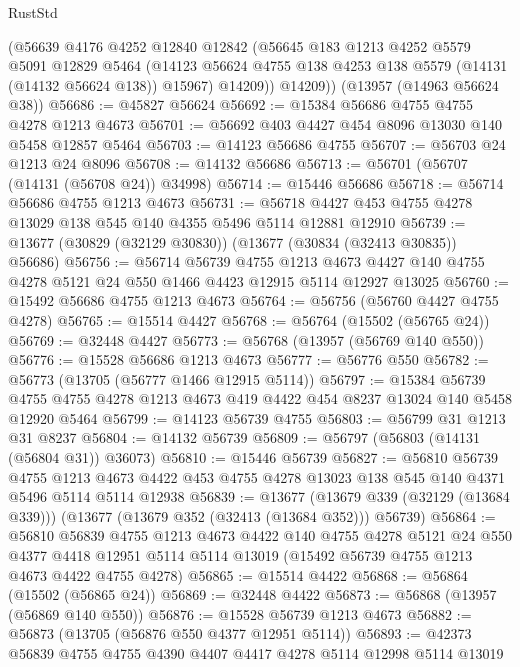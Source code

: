 \begin{lexlean}{RustStd}
\begin{coremodule}
        (@56639
          @4176
          @4252
          @12840
          @12842
          (@56645
            @183
            @1213
            @4252
            @5579
            @5091
            @12829
            @5464
            (@14123 @56624 @4755 @138 @4253 @138 @5579 (@14131 (@14132 @56624 @138)) @15967)
            @14209))
        @14209))
    (@13957 (@14963 @56624 @38))
@56686 := @45827 @56624
@56692 := @15384 @56686 @4755 @4755 @4278 @1213 @4673
@56701 := @56692 @403 @4427 @454 @8096 @13030 @140 @5458 @12857 @5464
@56703 := @14123 @56686 @4755
@56707 := @56703 @24 @1213 @24 @8096
@56708 := @14132 @56686
@56713 := @56701 (@56707 (@14131 (@56708 @24)) @34998)
@56714 := @15446 @56686
@56718 := @56714 @56686 @4755 @1213 @4673
@56731 := @56718 @4427 @453 @4755 @4278 @13029 @138 @545 @140 @4355 @5496 @5114 @12881 @12910
@56739 := @13677 (@30829 (@32129 @30830)) (@13677 (@30834 (@32413 @30835)) @56686)
@56756 := @56714
    @56739
    @4755
    @1213
    @4673
    @4427
    @140
    @4755
    @4278
    @5121
    @24
    @550
    @1466
    @4423
    @12915
    @5114
    @12927
    @13025
@56760 := @15492 @56686 @4755 @1213 @4673
@56764 := @56756 (@56760 @4427 @4755 @4278)
@56765 := @15514 @4427
@56768 := @56764 (@15502 (@56765 @24))
@56769 := @32448 @4427
@56773 := @56768 (@13957 (@56769 @140 @550))
@56776 := @15528 @56686 @1213 @4673
@56777 := @56776 @550
@56782 := @56773 (@13705 (@56777 @1466 @12915 @5114))
@56797 := @15384
    @56739
    @4755
    @4755
    @4278
    @1213
    @4673
    @419
    @4422
    @454
    @8237
    @13024
    @140
    @5458
    @12920
    @5464
@56799 := @14123 @56739 @4755
@56803 := @56799 @31 @1213 @31 @8237
@56804 := @14132 @56739
@56809 := @56797 (@56803 (@14131 (@56804 @31)) @36073)
@56810 := @15446 @56739
@56827 := @56810
    @56739
    @4755
    @1213
    @4673
    @4422
    @453
    @4755
    @4278
    @13023
    @138
    @545
    @140
    @4371
    @5496
    @5114
    @5114
    @12938
@56839 := @13677
    (@13679 @339 (@32129 (@13684 @339)))
    (@13677 (@13679 @352 (@32413 (@13684 @352))) @56739)
@56864 := @56810
    @56839
    @4755
    @1213
    @4673
    @4422
    @140
    @4755
    @4278
    @5121
    @24
    @550
    @4377
    @4418
    @12951
    @5114
    @5114
    @13019
    (@15492 @56739 @4755 @1213 @4673 @4422 @4755 @4278)
@56865 := @15514 @4422
@56868 := @56864 (@15502 (@56865 @24))
@56869 := @32448 @4422
@56873 := @56868 (@13957 (@56869 @140 @550))
@56876 := @15528 @56739 @1213 @4673
@56882 := @56873 (@13705 (@56876 @550 @4377 @12951 @5114))
@56893 := @42373 @56839 @4755 @4755 @4390 @4407 @4417 @4278 @5114 @12998 @5114 @13019

\end{coremodule}
\end{lexlean}
